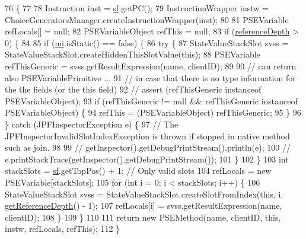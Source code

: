 \begin{DoxyCode}
76                                                                                                 \{
77 
78     Instruction inst = \hyperlink{classgov_1_1nasa_1_1jpf_1_1inspector_1_1server_1_1programstate_1_1_state_stack_frame_a99c4d184fc27fa72ef791c58822af3f7}{sf}.getPC();
79     InstructionWrapper instw = ChoiceGeneratorsManager.createInstructionWrapper(inst);
80 
81     PSEVariable refLocals[] = null;
82     PSEVariableObject refThis = null;
83     \textcolor{keywordflow}{if} (\hyperlink{classgov_1_1nasa_1_1jpf_1_1inspector_1_1server_1_1programstate_1_1_state_node_a55683618625dae46e8aa68d95811d6bb}{referenceDepth} > 0) \{
84 
85       \textcolor{keywordflow}{if} (\hyperlink{classgov_1_1nasa_1_1jpf_1_1inspector_1_1server_1_1programstate_1_1_state_stack_frame_aed952eab2d35bc628c9e8ba31630e3d5}{mi}.isStatic() == \textcolor{keyword}{false}) \{
86         \textcolor{keywordflow}{try} \{
87           StateValueStackSlot svss = StateValueStackSlot.createHiddenThisSlotValue(\textcolor{keyword}{this});
88           PSEVariable refThisGeneric = svss.getResultExpression(name, clientID);
89 
90           \textcolor{comment}{// can return also PSEVariablePrimitive ...}
91           \textcolor{comment}{// in case that there is no type information for the the fields (or the this field)}
92           \textcolor{comment}{// assert (refThisGeneric instanceof PSEVariableObject);}
93           \textcolor{keywordflow}{if} (refThisGeneric != null && refThisGeneric instanceof PSEVariableObject) \{
94             refThis = (PSEVariableObject) refThisGeneric;
95           \}
96         \} \textcolor{keywordflow}{catch} (JPFInspectorException e) \{
97           \textcolor{comment}{// The JPFInspectorInvalidSlotIndexException is thrown if stopped in native method such as join.}
98 
99           \textcolor{comment}{// getInspector().getDebugPrintStream().println(e);}
100           \textcolor{comment}{// e.printStackTrace(getInspector().getDebugPrintStream());}
101         \}
102       \}
103       \textcolor{keywordtype}{int} stackSlots = \hyperlink{classgov_1_1nasa_1_1jpf_1_1inspector_1_1server_1_1programstate_1_1_state_stack_frame_a99c4d184fc27fa72ef791c58822af3f7}{sf}.getTopPos() + 1; \textcolor{comment}{// Only valid slots}
104       refLocals = \textcolor{keyword}{new} PSEVariable[stackSlots];
105       \textcolor{keywordflow}{for} (\textcolor{keywordtype}{int} i = 0; i < stackSlots; i++) \{
106         StateValueStackSlot svss = StateValueStackSlot.createSlotFromIndex(\textcolor{keyword}{this}, i, 
      \hyperlink{classgov_1_1nasa_1_1jpf_1_1inspector_1_1server_1_1programstate_1_1_state_node_af59b1ac0319251e657293c810a16cdd9}{getReferenceDepth}() - 1);
107         refLocals[i] = svss.getResultExpression(name, clientID);
108       \}
109     \}
110 
111     \textcolor{keywordflow}{return} \textcolor{keyword}{new} PSEMethod(name, clientID, \textcolor{keyword}{this}, instw, refLocals, refThis);
112   \}
\end{DoxyCode}
